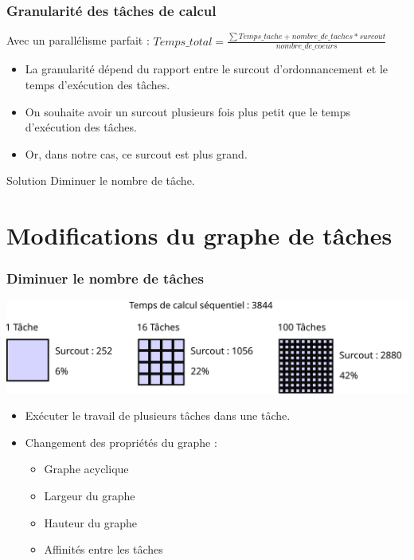 \documentclass{beamer}
\begin{document}
\begin{frame}
  \frametitle{Granularité des tâches de calcul}

  Avec un parallélisme parfait :
  $Temps\_total = \frac{\sum Temps\_tache + nombre\_de\_taches * surcout}{nombre\_de\_coeurs}$

  \pause

  \begin{itemize}
  \item<2-> La granularité dépend du rapport entre le surcout d'ordonnancement et le temps d'exécution des tâches.
  \item<3-> On souhaite avoir un surcout plusieurs fois plus petit que le temps d'exécution des tâches.
  \item<4-> Or, dans notre cas, ce surcout est plus grand.
  \end{itemize}

  \pause
  \pause
  \pause

  \begin{block}{Solution}
    Diminuer le nombre de tâche.
  \end{block}


\end{frame}

\section[Modifications graphe]{Modifications du graphe de tâches}
\begin{frame}
  \frametitle{Diminuer le nombre de tâches}

  \centerline{\includegraphics[width=\linewidth]{overhead}}


  \begin{itemize}
    \item<1-> Exécuter le travail de plusieurs tâches dans une tâche.
    \item<2-> Changement des propriétés du graphe :
      \begin{itemize}
        \item<2-> Graphe acyclique
        \item<2-> Largeur du graphe
        \item<2-> Hauteur du graphe
        \item<2-> Affinités entre les tâches
      \end{itemize}
  \end{itemize}

\end{frame}
\end{document}
